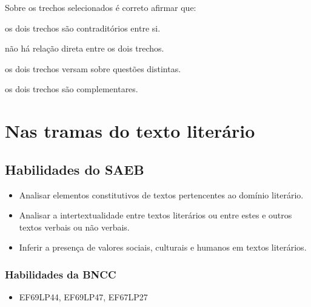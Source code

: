 Sobre os trechos selecionados é correto afirmar que:

\begin{escolha}

  \item os dois trechos são contraditórios entre si.

  \item não há relação direta entre os dois trechos.

  \item os dois trechos versam sobre questões distintas.

  \item os dois trechos são complementares. 

\end{escolha}

\chapter{Nas tramas do texto literário}

\section*{Habilidades do SAEB}

\begin{itemize}
  
  \item Analisar elementos constitutivos de textos pertencentes ao domínio literário.
  
  \item Analisar a intertextualidade entre textos literários ou entre estes e outros textos 
verbais ou não verbais.
  
  \item Inferir a presença de valores sociais, culturais e humanos em textos literários.

\end{itemize}

\subsection{Habilidades da BNCC}

\begin{itemize}

  \item EF69LP44, EF69LP47, EF67LP27

\end{itemize}

